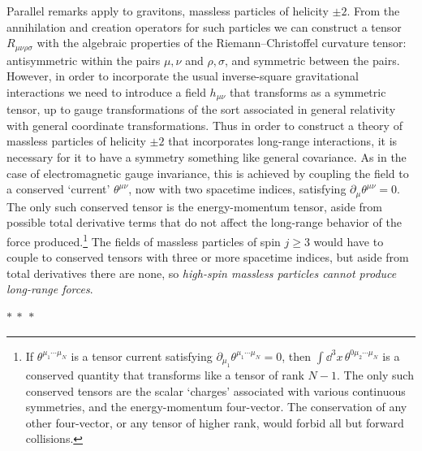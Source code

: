 Parallel remarks apply to gravitons, massless particles of helicity $\pm2$.
From the annihilation and creation operators for such particles we can
construct a tensor $R_{\mu\nu\rho\sigma}$ with the algebraic properties of the
Riemann--Christoffel curvature tensor: antisymmetric within the pairs $\mu,\nu$
and $\rho,\sigma$, and symmetric between the pairs. However, in order to
incorporate the usual inverse-square gravitational interactions we need to
introduce a field $h_{\mu\nu}$ that transforms as a symmetric tensor, up to
gauge transformations of the sort associated in general relativity with
general coordinate transformations. Thus in order to construct a theory of
massless particles of helicity $\pm2$ that incorporates long-range
interactions, it is necessary for it to have a symmetry something like general
covariance. As in the case of electromagnetic gauge invariance, this is
achieved by coupling the field to a conserved `current' $\theta^{\mu\nu}$, now
with two spacetime indices, satisfying $\partial_\mu\theta^{\mu\nu}=0$. The
only such conserved tensor is the energy-momentum tensor, aside from possible
total derivative terms that do not affect the long-range behavior of the force
produced.\footnote{If $\theta^{\mu_1\cdots\mu_N}$ is a tensor current
satisfying $\partial_{\mu_1}\theta^{\mu_1\cdots\mu_N}=0$, then
$\int \dd^3x\,\theta^{0\mu_2\cdots\mu_N}$ is a conserved quantity that
transforms like a tensor of rank $N-1$. The only such conserved tensors are the
scalar `charges' associated with various continuous symmetries, and the
energy-momentum four-vector. The conservation of any other four-vector, or any
tensor of higher rank, would forbid all but forward collisions.} The fields of
massless particles of spin $j\geq3$ would have to couple to conserved tensors
with three or more spacetime indices, but aside from total derivatives there
are none, so \emph{high-spin massless particles cannot produce long-range
forces}.

\begin{center}
$*\ *\ *$
\end{center}

